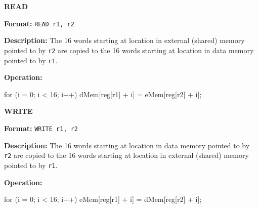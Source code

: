 \noindent\textsf{\textbf{\Large READ}}\par
{}\par\begin{indented}{\bf Format:}
{\tt READ r1, r2}\par\vspace{3ex}
\end{indented}\vspace{4ex}
\begin{indented}{\bf Description:}
The 16 words starting at location in external (shared) memory pointed to
by {\tt r2} are copied to the 16 words starting at location in data
memory pointed to by {\tt r1}.
\end{indented}
\begin{indented}{\bf Operation:}\vspace{.8ex}
\begin{verbatimtab}
for (i = 0; i < 16; i++) {
    dMem[reg[r1] + i] = eMem[reg[r2] + i];
}
\end{verbatimtab}
\end{indented}
\vspace{2em}

\newpage
\noindent\textsf{\textbf{\Large WRITE}}\par
{}\par\begin{indented}{\bf Format:}
{\tt WRITE r1, r2}\par\vspace{3ex}
\end{indented}\vspace{4ex}
\begin{indented}{\bf Description:}
The 16 words starting at location in data memory pointed to by {\tt
r2} are copied to the 16 words starting at location in external
(shared) memory pointed to by {\tt r1}.
\end{indented}
\begin{indented}{\bf Operation:}\vspace{.8ex}
\begin{verbatimtab}
for (i = 0; i < 16; i++) {
    eMem[reg[r1] + i] = dMem[reg[r2] + i];
}
\end{verbatimtab}
\end{indented}
\vspace{2em}

